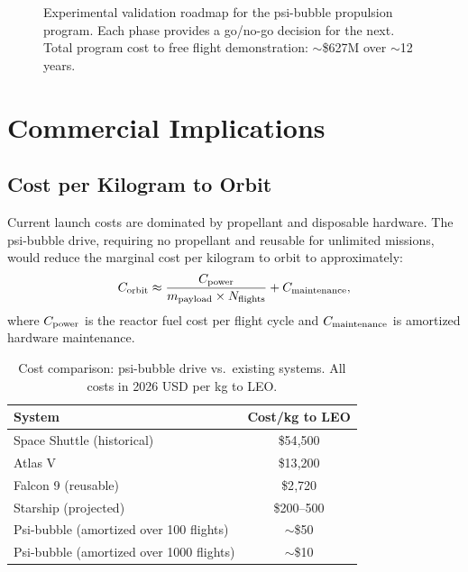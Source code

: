 \documentclass[twocolumn,prl,superscriptaddress,nofootinbib,longbibliography,floatfix]{revtex4-2}
\begin{document}
\begin{figure}[h]
\centering
{}
\caption{Experimental validation roadmap for the psi-bubble propulsion
program.  Each phase provides a go/no-go decision for the next.  Total
program cost to free flight demonstration: $\sim$\$627M over
$\sim$12 years.}
\label{fig:roadmap}
\end{figure}

\section{Commercial Implications}\label{sec:commercial}

\subsection{Cost per Kilogram to Orbit}

Current launch costs are dominated by propellant and disposable
hardware.  The psi-bubble drive, requiring no propellant and reusable
for unlimited missions, would reduce the marginal cost per kilogram to
orbit to approximately:
\begin{equation}
C_{\rm orbit} \approx \frac{C_{\rm power}}{m_{\rm payload}
\times N_{\rm flights}}
+ C_{\rm maintenance},
\label{eq:cost-orbit}
\end{equation}
where $C_{\rm power}$ is the reactor fuel cost per flight cycle and
$C_{\rm maintenance}$ is amortized hardware maintenance.

\begin{table}[h]
\centering
\caption{Cost comparison: psi-bubble drive vs.\ existing systems.
All costs in 2026 USD per kg to LEO.}
\label{tab:cost}
\begin{ruledtabular}
\begin{tabular}{lc}
System & Cost/kg to LEO \\
\hline
Space Shuttle (historical) & \$54{,}500 \\
Atlas V & \$13{,}200 \\
Falcon 9 (reusable) & \$2{,}720 \\
Starship (projected) & \$200--500 \\
\hline
Psi-bubble (amortized over 100 flights) & $\sim$\$50 \\
Psi-bubble (amortized over 1000 flights) & $\sim$\$10 \\
\end{tabular}
\end{ruledtabular}
\end{table}
\end{document}
